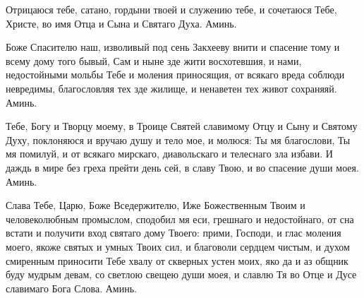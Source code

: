 \mychapterending


\begin{mymulticols}





Отрицаюся тебе, сатано, гордыни твоей и служению тебе, и сочетаюся Тебе, Христе, во имя Отца и Сына и Святаго Духа. Аминь. 




\end{mymulticols}

\mychapterending


\begin{mymulticols}



Боже Спасителю наш, изволивый под сень Закхееву внити и спасение тому и всему дому того бывый, Сам и ныне зде жити восхотевшия, и нами, недостойными мольбы Тебе и моления приносящия, от всякаго вреда соблюди невредимы, благословляя тех зде жилище, и ненаветен тех живот сохраняяй. Аминь.




\end{mymulticols}

\mychapterending


\begin{mymulticols}



Тебе, Богу и Творцу моему, в Троице Святей славимому Отцу и Сыну и Святому Духу, поклоняюся и вручаю душу и тело мое, и молюся: Ты мя благослови, Ты мя помилуй, и от всякаго мирскаго, диавольскаго и телеснаго зла избави. И даждь в мире без греха прейти день сей, в славу Твою, и во спасение души моея. Аминь.


Слава Тебе, Царю, Боже Вседержителю, Иже Божественным Твоим и человеколюбным промыслом, сподобил мя еси, грешнаго и недостойнаго, от сна встати и получити вход святаго дому Твоего: прими, Господи, и глас моления моего, якоже святых и умных Твоих сил, и благоволи сердцем чистым, и духом смиренным приносити Тебе хвалу от скверных устен моих, яко да и аз общник буду мудрым девам, со светлою свещею души моея, и славлю Тя во Отце и Дусе славимаго Бога Слова. Аминь.




\end{mymulticols}

